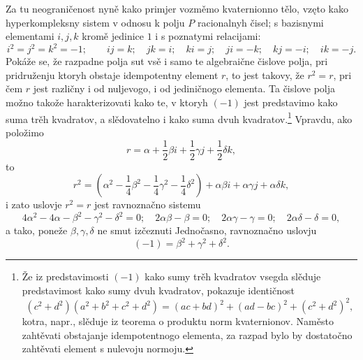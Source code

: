 \documentclass[11pt]{article}
\begin{document}
\noindent Za tu neograničenost nyně kako primjer vozměmo kvaternionno tělo, vzęto kako hyperkompleksny sistem v odnosu k polju $P$ racionalnyh čisel; s bazisnymi elementami $i,j,k$ kromě jedinice $1$ i s poznatymi relacijami:
\[
 i^2=j^2=k^2=-1;\qquad ij=k;\quad jk=i;\quad ki=j;\quad ji=-k;\quad kj=-i;\quad ik=-j.
\]
Pokáže se, že razpadne polja sut vsě i samo te algebraične čislove polja, pri pridruženju ktoryh obstaje idempotentny element $r$, to jest takovy, že $r^2=r$, pri čem $r$ jest različny i od nuljevogo, i od jediničnogo elementa. Ta čislove polja možno takože harakterizovati kako te, v ktoryh $(-1)$ jest predstavimo kako suma trěh kvadratov, a slědovatelno i kako suma dvuh kvadratov.\footnote{Že iz predstavimosti $(-1)$ kako sumy trěh kvadratov vsegda slěduje predstavimost kako sumy dvuh kvadratov, pokazuje identičnost
\[
(c^2+d^2)(a^2+b^2+c^2+d^2)=(ac+bd)^2+(ad-bc)^2+(c^2+d^2)^2,
\]
kotra, napr., slěduje iz teorema o produktu norm kvaternionov. Naměsto zahtěvati obstajanje idempotentnogo elementa, za razpad bylo by dostatočno zahtěvati element s nulevoju normoju.} Vpravdu, ako položimo
\[
        r=\alpha+\frac12\beta i+\frac12\gamma j+\frac12\delta k,
\]
to
\[
        r^2=\left(\alpha^2-\frac14\beta^2-\frac14\gamma^2-\frac14\delta^2\right)
          +\alpha\beta i+\alpha\gamma j+\alpha\delta k,
\]
i zato uslovje $r^2=r$ jest ravnoznačno sistemu
\[
4\alpha^2-4\alpha-\beta^2-\gamma^2-\delta^2=0;\quad
2\alpha\beta-\beta=0;\quad 2\alpha\gamma-\gamma=0;\quad 2\alpha\delta-\delta=0,
\]
a tako, poneže $\beta,\gamma,\delta$ ne smut izčeznuti Jednočasno, ravnoznačno uslovju
\[
        (-1)=\beta^2+\gamma^2+\delta^2.
\]
\end{document}
